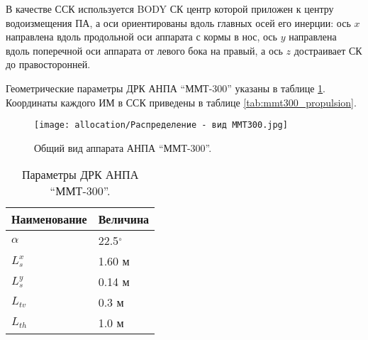 В качестве ССК используется BODY СК \cite{fossen2011handbook} центр которой приложен к центру водоизмещения ПА, а оси ориентированы вдоль главных осей его инерции: ось $x$ направлена вдоль продольной оси аппарата с кормы в нос, ось $y$ направлена вдоль поперечной оси аппарата от левого бока на правый, а ось $z$ достраивает СК до правосторонней.

Геометрические параметры ДРК АНПА ``ММТ-300'' указаны в таблице \ref{tab:mmt300_propulsion_param}.
Координаты каждого ИМ в ССК приведены в таблице \ref{tab:mmt300_propulsion}.

\begin{figure}[ht]
    \centering
    \texttt{[image: allocation/Распределение - вид ММТ300.jpg]}
    \caption{Общий вид аппарата АНПА ``ММТ-300''.}
    \label{fig:mmt-300}
\end{figure}

\begin{table}
    \caption{Параметры ДРК АНПА ``ММТ-300''.}
    \label{tab:mmt300_propulsion_param}
    \centering
    \begin{tabular}{ll}
        \toprule
        Наименование & Величина \\ 
        \midrule
        $\alpha$ & 22.5$^{\circ}$ \\
        $L_s^x$ & 1.60 м \\
        $L_s^y$ & 0.14 м \\
        $L_{tv}$ & 0.3 м \\
        $L_{th}$ & 1.0 м \\
        \bottomrule
    \end{tabular}
\end{table}

